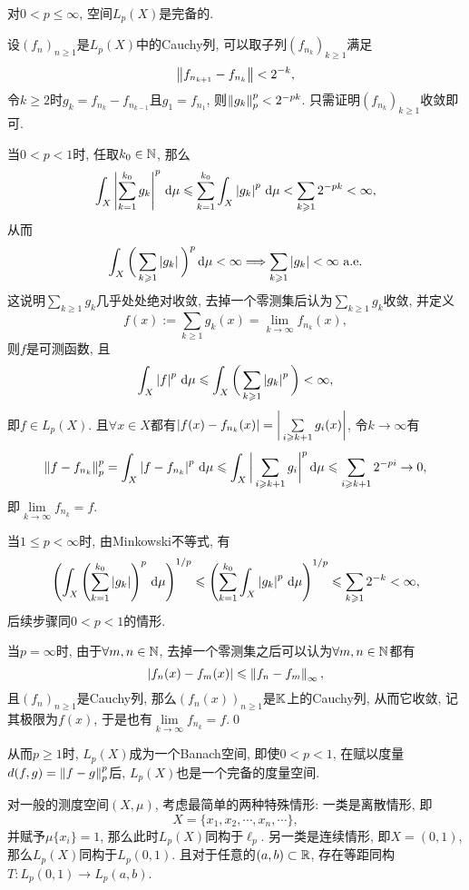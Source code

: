 	\begin{Theorem}
	对$ 0<p\leqslant\infty $, 空间$ L_p(X) $是完备的.
	\end{Theorem}
	\begin{Proof}
	设$ (f_n)_{n\geqslant 1} $是$ L_p(X) $中的Cauchy列, 可以取子列$ (f_{n_k})_{k\geqslant 1} $满足
	\[
	\left\| f_{n_{k+1}}-f_{n_k} \right\|<2^{-k},
	\]
	令$ k\geqslant 2 $时$ g_k=f_{n_k}-f_{n_{k-1}} $且$ g_1=f_{n_1} $, 则$ \left\| g_k \right\|_p^p<2^{-pk} $. 只需证明$ (f_{n_k})_{k\geqslant 1} $收敛即可.
	
	当$ 0<p<1 $时, 任取$ k_0\in\mathbb{N} $, 那么
	\[
	\int_X\left| \sum_{k=1}^{k_0}g_k \right| ^p\,\mathrm{d}\mu\leqslant\sum_{k=1}^{k_0}\int_X\left| g_k \right| ^p\,\mathrm{d}\mu<\sum_{k\geqslant 1}2^{-pk}<\infty,
	\]
	从而
	\[
	\int_X\bigg(\sum_{k\geqslant 1}\left| g_k \right| \bigg)^p\,\mathrm{d}\mu<\infty\Longrightarrow\sum_{k\geqslant 1}\left| g_k \right| <\infty\ \text{a.e.}
	\]
	这说明$ \sum\limits_{k\geqslant 1}g_k $几乎处处绝对收敛, 去掉一个零测集后认为$ \sum\limits_{k\geqslant 1}g_k $收敛, 并定义
	\[
	f(x):=\sum_{k\geqslant 1}g_k(x)=\lim_{k\to\infty}f_{n_k}(x),
	\]
	则$ f $是可测函数, 且
	\[
	\int_X\left| f \right| ^p\,\mathrm{d}\mu\leqslant\int_X\bigg(\sum_{k\geqslant 1}\left| g_k \right| ^p\bigg)<\infty,
	\]
	即$ f\in L_p(X) $. 且$ \forall x\in X $都有$ \left| f(x)-f_{n_k}(x) \right| =\bigg|\sum\limits_{i\geqslant k+1}g_i(x)\bigg| $, 令$ k\to\infty $有
	\[
	\left\| f-f_{n_k} \right\|_p^p=\int_X\left| f-f_{n_k} \right| ^p\,\mathrm{d}\mu\leqslant\int_X\bigg|\sum_{i\geqslant k+1}g_i\bigg|^p\,\mathrm{d}\mu\leqslant\sum_{i\geqslant k+1}2^{-pi}\to 0,
	\]
	即$ \lim\limits_{k\to\infty}f_{n_k}=f $.
	
	当$ 1\leqslant p<\infty $时, 由Minkowski不等式, 有
	\[
	\left( \int_X\left( \sum_{k=1}^{k_0}\left| g_k \right|  \right)^p\,\mathrm{d}\mu \right)^{1/p}\leqslant\left( \sum_{k=1}^{k_0}\int_X\left| g_k \right| ^p\,\mathrm{d}\mu \right)^{1/p}\leqslant\sum_{k\geqslant 1}2^{-k}<\infty,
	\]
	后续步骤同$ 0<p<1 $的情形.
	
	当$ p=\infty $时, 由于$ \forall m,n\in\mathbb{N} $, 去掉一个零测集之后可以认为$ \forall m,n\in\mathbb{N} $都有
	\[
	\left| f_n(x)-f_m(x) \right| \leqslant\left\| f_n-f_m \right\|_\infty,
	\]
	且$ (f_n)_{n\geqslant 1} $是Cauchy列, 那么$ (f_n(x))_{n\geqslant 1} $是$ \mathbb{K} $上的Cauchy列, 从而它收敛, 记其极限为$ f(x) $, 于是也有$ \lim\limits_{k\to\infty}f_{n_k}=f $.\qed
	\end{Proof}
	
	从而$ p\geqslant 1 $时, $ L_p(X) $成为一个Banach空间, 即使$ 0<p<1 $, 在赋以度量$ d(f,g)=\left\| f-g \right\|_p^p $后, $ L_p(X) $也是一个完备的度量空间.
	
	对一般的测度空间$ (X,\mu) $, 考虑最简单的两种特殊情形: 一类是离散情形, 即
	\[
	X=\{ x_1,x_2,\cdots,x_n,\cdots \},
	\]
	并赋予$ \mu\{x_i\}=1 $, 那么此时$ L_p(X) $同构于$ \ell_p $. 另一类是连续情形, 即$ X=(0,1) $, 那么$ L_p(X) $同构于$ L_p(0,1) $. 且对于任意的$ (a,b)\subset\mathbb{R} $, 存在等距同构$ T : L_p(0,1)\to L_p(a,b) $.
	
